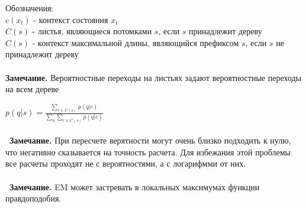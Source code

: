 \documentclass[10pt,a4paper]{article}
\begin{document}
Обозначения: 
\\
$ c(x_{t}) $ - контекст состояния $ x_{t} $ 
\\
$ C(s) $ - листья, являющиеся потомками $ s $, если $ s $ принадлежит дереву 
\\
$ C(s) $ - контекст максимальной длины, являющийся префиксом $ s $, если $ s $ не принадлежит дереву 
\\\\
\textbf{Замечание.}  Вероятностные переходы на листьях задают вероятностные переходы на всем дереве

$ p(q|s) = \frac{\sum_{c \in C(s)} {p(q|c)}}{\sum_q\sum_{c \in C(s)} {p(q|c)}} $ 
\\\\\
\textbf{Замечание.} При пересчете верятности могут очень близко подходить к нулю, что негативно сказывается на точность расчета. Для избежания этой проблемы все расчеты проходят не с вероятностями, а с логарифмми от них.
\\\\\
\textbf{Замечание.} EM может застревать в локальных максимумах функции правдоподобия.
\end{document}
